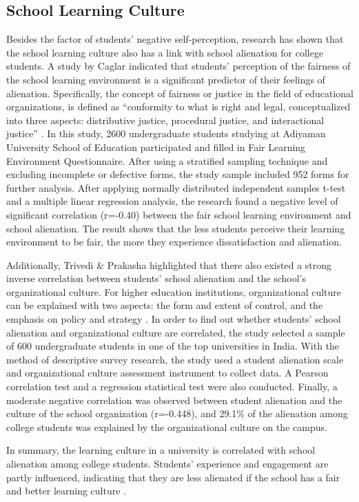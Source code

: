 \documentclass{scupi_apa_thesis}
\begin{document}
\subsection{School Learning Culture}
\par
Besides the factor of students' negative self-perception, research has shown that the school learning culture also has a link with school alienation for college students. 
A study by Caglar \citeyear{caglar2013relationship} indicated that students' perception of the fairness of the school learning environment is a significant predictor of their feelings of alienation. 
Specifically, the concept of fairness or justice in the field of educational organizations, is defined as “conformity to what is right and legal, conceptualized into three aspects: distributive justice, procedural justice, and interactional justice” \cite{caglar2013relationship}. 
In this study, 2600 undergraduate students studying at Adiyaman University School of Education participated and filled in Fair Learning Environment Questionnaire. 
After using a stratified sampling technique and excluding 
incomplete or defective forms, the study sample included 952 forms for further analysis. 
After applying normally distributed independent samples t-test and a multiple linear regression analysis, the research found a negative level of significant correlation (r=-0.40) between the fair school learning environment and school alienation. 
The result shows that the less students perceive their learning environment to be fair, the more they experience dissatisfaction and alienation.
\par
Additionally, Trivedi \& Prakasha \citeyear{trivedi2021student} highlighted that there also existed a strong inverse correlation between students' school alienation and the school's organizational culture. 
For higher education institutions, organizational culture can be explained with two aspects: the form and extent of control, and the emphasis on policy and strategy \cite{velden2012institutional}. 
In order to find out whether students' school alienation and organizational culture are correlated, the study selected a sample of 600 undergraduate students in one of the top universities in India. 
With the method of descriptive survey research, the study used a student alienation scale and organizational culture assessment instrument to collect data. 
A Pearson correlation test and a regression statistical test were also conducted. 
Finally, a moderate negative correlation was observed between student alienation and the culture of the school organization (r=-0.448), and 29.1\% of the alienation among college students was explained by the organizational culture on the campus.
\par
In summary, the learning culture in a university is correlated with school alienation among college students. Students' experience and engagement are partly influenced, indicating that they are less alienated if the school has a fair and better learning culture \cite{trivedi2021student}. 
\end{document}
